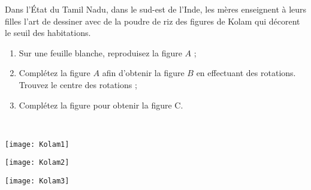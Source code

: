 
\begin{TP}

\begin{minipage}[t]{0.48\linewidth}
Dans l'État du Tamil Nadu, dans le sud-est de l'Inde, les mères enseignent à leurs filles l'art de dessiner avec de la poudre de riz des figures de Kolam qui décorent le seuil des habitations.
 \end{minipage} \hfill%
 \begin{minipage}[t]{0.48\linewidth}
 \begin{enumerate}
  \item Sur une feuille blanche, reproduisez la figure $A$ ;
  \item Complétez la figure $A$ afin d'obtenir la figure $B$ en effectuant des rotations. Trouvez le centre des rotations ;
  \item Complétez la figure pour obtenir la figure C. 
  \end{enumerate}
  \end{minipage} \\
  
\begin{minipage}[t]{0.32\linewidth}
 \texttt{[image: Kolam1]}
 \end{minipage} \hfill%
 \begin{minipage}[t]{0.32\linewidth}
  \texttt{[image: Kolam2]}
  \end{minipage} \hfill%
  \begin{minipage}[t]{0.32\linewidth}
   \texttt{[image: Kolam3]}
   \end{minipage} \\

\end{TP}

\vfill
